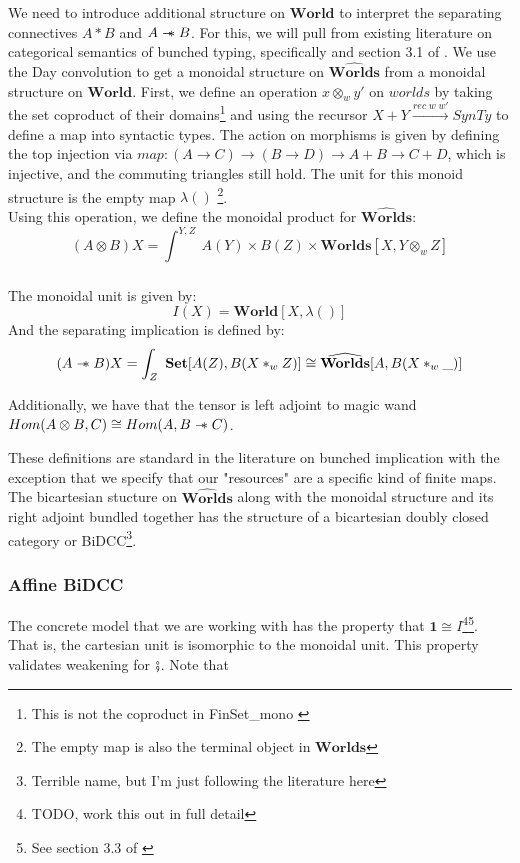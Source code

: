 \documentclass{article}
\newcommand{\sep}{\mathrel{-\mkern-6mu*}}
\newcommand{\worlds}{\widehat{\mathbf{Worlds}}}
\newcommand{\world}{{\mathbf{World}}}
\begin{document}
  We need to introduce additional structure on $\world$ to interpret the 
  separating connectives $A * B$ and $A\sep B$. For this, we will pull 
  from existing literature on categorical semantics of bunched typing, 
  specifically \cite{ohearnResourceInterpretationsBunched1999} and section 3.1 of \cite{pym_semantics_2002}. 
  We use the Day convolution \cite{nlabDayConv} to get a monoidal structure on 
  $\worlds$ from a monoidal structure on $\world$. First, we define an 
  operation $x \otimes_w y'$ on $worlds$ by taking the set coproduct of 
  their domains\footnote{This is not the coproduct in FinSet\_mono \cite{SE-FinSetMonoCoprod}} 
  and using the recursor $X + Y \xrightarrow{rec \; w \; w'} SynTy$ 
  to define a map into syntactic types. The action on morphisms 
  is given by defining the top injection via $map : (A \rightarrow C) \rightarrow 
  (B \rightarrow D) \rightarrow A + B \rightarrow C + D$,
  which is injective, and the commuting triangles still hold. 
  The unit for this monoid structure is the empty map $\lambda()$
\footnote{The empty map is also the terminal object in $\mathbf{Worlds}$}.
\\
Using this operation, we define the monoidal product for $\worlds$: 
\[
(A \otimes B) X = \int_{}^{Y,Z}\ A(Y) \times B(Z) \times \mathbf{Worlds}[X,Y \otimes_w Z]
\]
\\
The monoidal unit is given by: 
\[ 
    I(X) = \mathbf{World}[X , \lambda()]
\]
And the separating implication is defined by: 
\[
(A \sep B) X = \int_{Z}^{}\ \mathbf{Set}[A(Z), B(X *_w Z)] \cong \worlds[A, B(X*_w\_)]
\]

Additionally, we have that the tensor is left adjoint to magic wand 
$Hom(A \otimes B , C) \cong Hom(A , B \sep C)$. 






These definitions 
are standard in the literature on bunched implication with the 
exception that we specify that our "resources" are a specific kind 
of finite maps. The bicartesian stucture on $\worlds$ along with 
the monoidal structure and its right adjoint bundled together 
has the structure of a bicartesian doubly closed category or 
BiDCC\footnote{Terrible name, but I'm just following the literature here}.

\subsubsection{Affine BiDCC}
The concrete model that we are working with has the property 
that $\mathbf{1} \cong I$\footnote{TODO, work this out in 
full detail}\footnote{See section 3.3 of \cite{pym_semantics_2002}}. 
That is, the cartesian unit is isomorphic to the monoidal unit. 
This property validates weakening for $\fatsemi$. Note that
\end{document}
